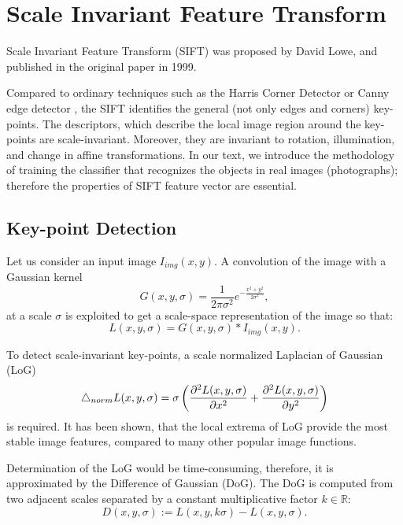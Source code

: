 \section{Scale Invariant Feature Transform}
Scale Invariant Feature Transform (SIFT) was proposed by David Lowe, and published in the original paper \cite{Lowe1999} in 1999.

Compared to ordinary techniques such as the Harris Corner Detector \cite{Harris1988} or Canny edge detector \cite{Canny1986}, the SIFT identifies the general (not only edges and corners) key-points. The descriptors, which describe the local image region around the key-points are scale-invariant. Moreover, they are invariant to rotation, illumination, and change in affine transformations. In our text, we introduce the methodology of training the classifier that recognizes the objects in real images (photographs); therefore the properties of SIFT feature vector are essential.

\subsection{Key-point Detection}

Let us consider an input image \( I_{img}(x,y) \). A convolution of the image with a Gaussian kernel
\begin{equation}
    G(x,y,\sigma) = \frac{1}{2\pi\sigma^2}e^{-\frac{x^2+y^2}{2\sigma^2}},
    \label{eq:Gaussian_kernel}
\end{equation}
at a scale \( \sigma \) is exploited to get a scale-space representation of the image so that:
\begin{equation}
    L(x, y,\sigma) =  G(x,y,\sigma)*I_{img}(x,y).
\end{equation}

To detect scale-invariant key-points, a scale normalized Laplacian of Gaussian (LoG)
\begin{equation}
    \mathop{}\!\mathbin\bigtriangleup_{norm} L(x, y, \sigma) = \sigma\left(\frac{\partial^2 L(x,y,\sigma)}{\partial x^2} + \frac{\partial^2 L(x,y,\sigma)}{\partial y^2}\right)
\end{equation}
is required\cite{Koenderink1984}. It has been shown\cite{Mikolajczyk2002}, that the local extrema of LoG provide the most stable image features, compared to many other popular image functions.

Determination of the LoG would be time-consuming, therefore, it is approximated by the Difference of Gaussian (DoG)\cite{Lowe2004}. The DoG is computed from two adjacent scales separated by a constant multiplicative factor $k \in \mathbb{R}$:
\begin{equation}
    D(x,y,\sigma) := L(x,y,k\sigma) - L(x,y,\sigma).
\end{equation}

